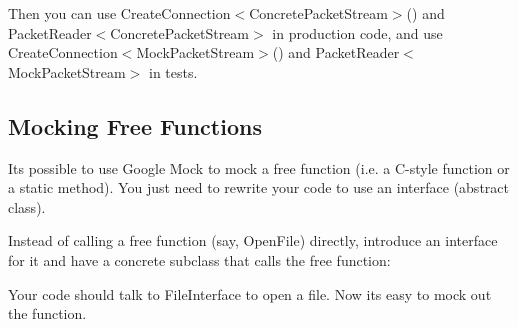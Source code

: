 \begin{DoxyCode}{0}
\DoxyCodeLine{}
\DoxyCodeLine{\};}
\end{DoxyCode}


Then you can use {\ttfamily Create\+Connection$<$Concrete\+Packet\+Stream$>$()} and {\ttfamily Packet\+Reader$<$Concrete\+Packet\+Stream$>$} in production code, and use {\ttfamily Create\+Connection$<$Mock\+Packet\+Stream$>$()} and {\ttfamily Packet\+Reader$<$Mock\+Packet\+Stream$>$} in tests.


\begin{DoxyCode}{0}
\end{DoxyCode}


\subsection*{Mocking Free Functions}

It\textquotesingle{}s possible to use Google Mock to mock a free function (i.\+e. a C-\/style function or a static method). You just need to rewrite your code to use an interface (abstract class).

Instead of calling a free function (say, {\ttfamily Open\+File}) directly, introduce an interface for it and have a concrete subclass that calls the free function\+:


\begin{DoxyCode}{0}
\DoxyCodeLine{\};}
\DoxyCodeLine{}
\DoxyCodeLine{  \}}
\DoxyCodeLine{\};}
\end{DoxyCode}


Your code should talk to {\ttfamily File\+Interface} to open a file. Now it\textquotesingle{}s easy to mock out the function.

